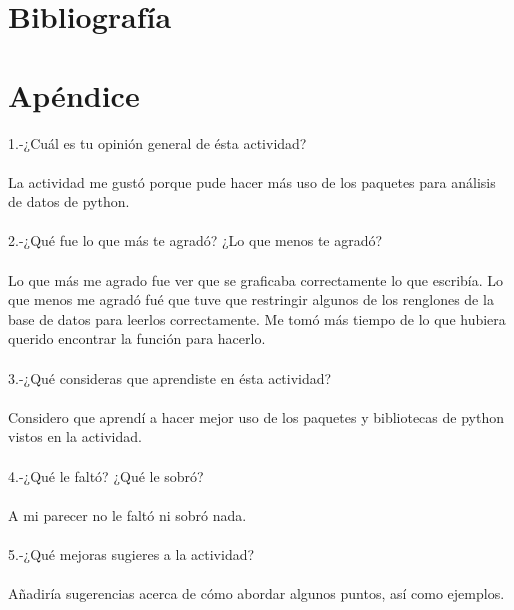 \documentclass{article}
\begin{document}
\section{Bibliografía}

\section{Apéndice}
1.-¿Cuál es tu opinión general de ésta actividad?\\
\\
La actividad me gustó porque pude hacer más uso de los paquetes para análisis de datos de python.\\
\\
2.-¿Qué fue lo que más te agradó? ¿Lo que menos te agradó?\\
\\
Lo que más me agrado fue ver que se graficaba correctamente lo que escribía. Lo que menos me agradó fué que tuve que restringir algunos de los renglones de la base de datos para leerlos correctamente. Me tomó más tiempo de lo que hubiera querido encontrar la función para hacerlo.\\
\\
3.-¿Qué consideras que aprendiste en ésta actividad?\\
\\
Considero que aprendí a hacer mejor uso de los paquetes y bibliotecas de python vistos en la actividad.\\
\\
4.-¿Qué le faltó? ¿Qué le sobró?\\
\\
A mi parecer no le faltó ni sobró nada.\\
\\
5.-¿Qué mejoras sugieres a la actividad?\\
\\
Añadiría sugerencias acerca de cómo abordar algunos puntos, así como ejemplos.\\
\\
\end{document}
